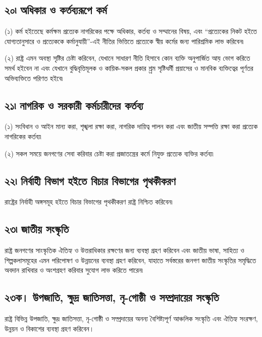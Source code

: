 \documentclass[11pt]{article}
\begin{document}
\subsection{২০৷ অধিকার ও কর্তব্যরূপে কর্ম}
\label{sec:orgf0c8bc5}
(১) কর্ম হইতেছে কর্মক্ষম প্রত্যেক নাগরিকের পক্ষে অধিকার, কর্তব্য ও সম্মানের
    বিষয়, এবং “প্রত্যেকের নিকট হইতে যোগ্যতানুসারে ও প্রত্যেককে কর্মানুযায়ী”-এই
    নীতির ভিত্তিতে প্রত্যেকে স্বীয় কর্মের জন্য পারিশ্রমিক লাভ করিবেন৷

(২) রাষ্ট্র এমন অবস্থা সৃষ্টির চেষ্টা করিবেন, যেখানে সাধারণ নীতি হিসাবে কোন
    ব্যক্তি অনুপার্জিত আয় ভোগ করিতে সমর্থ হইবেন না এবং যেখানে বুদ্ধিবৃত্তিমূলক ও
    কায়িক-সকল প্রকার শ্র্রম সৃষ্টিধর্মী প্রয়াসের ও মানবিক ব্যক্তিত্বের পূর্ণতর
    অভিব্যক্তিতে পরিণত হইবে৷

\subsection{২১৷ নাগরিক ও সরকারী কর্মচারীদের কর্তব্য}
\label{sec:org126f144}
(১) সংবিধান ও আইন মান্য করা, শৃঙ্খলা রক্ষা করা, নাগরিক দায়িত্ব পালন করা এবং
    জাতীয় সম্পত্তি রক্ষা করা প্রত্যেক নাগরিকের কর্তব্য৷

(২) সকল সময়ে জনগণের সেবা করিবার চেষ্টা করা প্রজাতন্ত্রের কর্মে নিযুক্ত প্রত্যেক
    ব্যক্তির কর্তব্য৷

\subsection{২২৷ নির্বাহী বিভাগ হইতে বিচার বিভাগের পৃথকীকরণ}
\label{sec:orgbff9e65}
রাষ্ট্রের নির্বাহী অঙ্গসমূহ হইতে বিচার বিভাগের পৃথকীকরণ রাষ্ট্র নিশ্চিত করিবেন৷

\subsection{২৩৷ জাতীয় সংস্কৃতি}
\label{sec:org03e9835}
রাষ্ট্র জনগণের সাংস্কৃতিক ঐতিহ্য ও উত্তরাধিকার রক্ষণের জন্য ব্যবস্থা গ্রহণ
করিবেন এবং জাতীয় ভাষা, সাহিত্য ও শিল্পকলাসমূহের এমন পরিপোষণ ও উন্নয়নের
ব্যবস্থা গ্রহণ করিবেন, যাহাতে সর্বস্তরের জনগণ জাতীয় সংস্কৃতির সমৃদ্ধিতে অবদান
রাখিবার ও অংশগ্রহণ করিবার সুযোগ লাভ করিতে পারেন৷

\subsection{২৩ক। উপজাতি, ক্ষুদ্র জাতিসত্তা, নৃ-গোষ্ঠী ও সম্প্রদায়ের সংস্কৃতি}
\label{sec:org8ce87dc}
রাষ্ট্র বিভিন্ন উপজাতি, ক্ষুদ্র জাতিসত্তা, নৃ-গোষ্ঠী ও সম্প্রদায়ের অনন্য
বৈশিষ্ট্যপূর্ণ আঞ্চলিক সংস্কৃতি এবং ঐতিহ্য সংরক্ষণ, উন্নয়ন ও বিকাশের ব্যবস্থা গ্রহণ
করিবেন।
\end{document}
